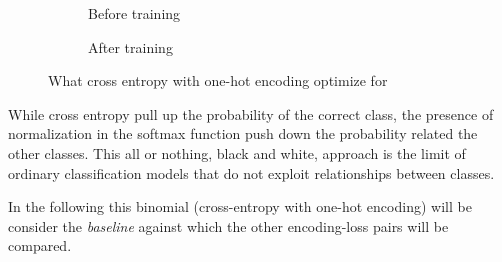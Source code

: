\begin{figure}[htbp]
  \centering
  \begin{subfigure}{0.45\textwidth}
    \centering
    \begin{minipage}{\textwidth}
      \resizebox{\linewidth}{!}{}
    \end{minipage}
    \caption{Before training}
    \label{fig:03/xe-onehot-before}
  \end{subfigure}
  \begin{subfigure}{0.45\textwidth}
    \centering
    \begin{minipage}{\textwidth}
      \resizebox{\linewidth}{!}{}
    \end{minipage}
    \caption{After training}
    \label{fig:03/xe-onehot-after}
  \end{subfigure}
  \caption{What cross entropy with one-hot encoding optimize for}
\end{figure}

While cross entropy pull up the probability of the correct class, the presence
of normalization in the softmax function push down the probability related the
other classes. This all or nothing, black and white, approach is the limit of
ordinary classification models that do not exploit relationships between
classes.

In the following this binomial (cross-entropy with one-hot encoding) will be
consider the \emph{baseline} against which the other encoding-loss pairs will be
compared.

